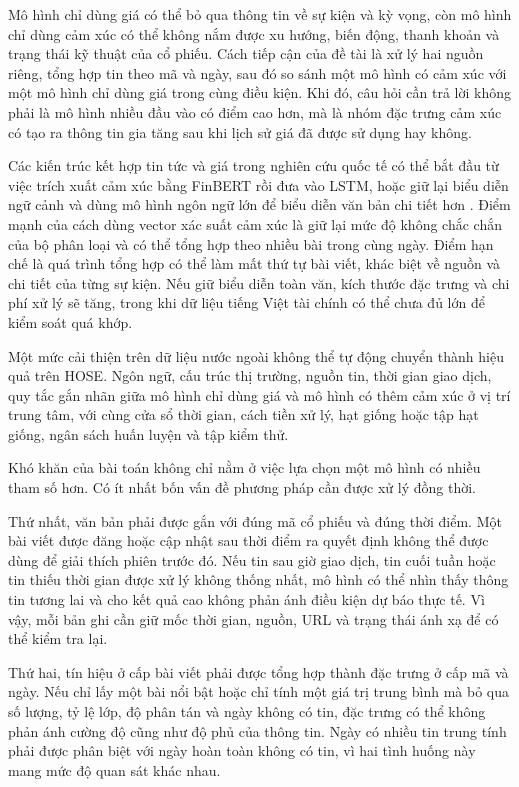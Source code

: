 Mô hình chỉ dùng giá có thể bỏ qua thông tin về sự kiện và kỳ vọng, còn mô hình chỉ dùng
cảm xúc có thể không nắm được xu hướng, biến động, thanh khoản và trạng thái kỹ thuật
của cổ phiếu. Cách tiếp cận của đề tài là xử lý hai nguồn riêng, tổng hợp tin theo mã
và ngày, sau đó so sánh một mô hình có cảm xúc với một mô hình chỉ dùng giá trong cùng
điều kiện. Khi đó, câu hỏi cần trả lời không phải là mô hình nhiều đầu vào có điểm cao
hơn, mà là nhóm đặc trưng cảm xúc có tạo ra thông tin gia tăng sau khi lịch sử giá đã
được sử dụng hay không.

Các kiến trúc kết hợp tin tức và giá trong nghiên cứu quốc tế có thể bắt đầu từ việc
trích xuất cảm xúc bằng FinBERT rồi đưa vào LSTM, hoặc giữ lại biểu diễn ngữ cảnh và
dùng mô hình ngôn ngữ lớn để biểu diễn văn bản chi tiết hơn
\cite{Halder2022_221107392v1,Gu2024_240716150v1,Elahi2024_241101368v1}. Điểm mạnh của
cách dùng vector xác suất cảm xúc là giữ lại mức độ không chắc chắn của bộ phân loại
và có thể tổng hợp theo nhiều bài trong cùng ngày. Điểm hạn chế là quá trình tổng hợp
có thể làm mất thứ tự bài viết, khác biệt về nguồn và chi tiết của từng sự kiện. Nếu
giữ biểu diễn toàn văn, kích thước đặc trưng và chi phí xử lý sẽ tăng, trong khi dữ
liệu tiếng Việt tài chính có thể chưa đủ lớn để kiểm soát quá khớp.

Một mức cải thiện trên dữ liệu nước ngoài không thể tự động chuyển thành hiệu quả trên
HOSE. Ngôn ngữ, cấu trúc thị trường, nguồn tin, thời gian giao dịch, quy tắc gắn nhãn
giữa mô hình chỉ dùng giá và mô hình có thêm cảm xúc ở vị trí trung tâm, với cùng cửa sổ
thời gian, cách tiền xử lý, hạt giống hoặc tập hạt giống, ngân sách huấn luyện và tập kiểm thử.

Khó khăn của bài toán không chỉ nằm ở việc lựa chọn một mô hình có nhiều tham số hơn.
Có ít nhất bốn vấn đề phương pháp cần được xử lý đồng thời.

Thứ nhất, văn bản phải được gắn với đúng mã cổ phiếu và đúng thời điểm. Một bài viết
được đăng hoặc cập nhật sau thời điểm ra quyết định không thể được dùng để giải thích
phiên trước đó. Nếu tin sau giờ giao dịch, tin cuối tuần hoặc tin thiếu thời gian được
xử lý không thống nhất, mô hình có thể nhìn thấy thông tin tương lai và cho kết quả cao
không phản ánh điều kiện dự báo thực tế. Vì vậy, mỗi bản ghi cần giữ mốc thời gian, nguồn,
URL và trạng thái ánh xạ để có thể kiểm tra lại.

Thứ hai, tín hiệu ở cấp bài viết phải được tổng hợp thành đặc trưng ở cấp mã và ngày.
Nếu chỉ lấy một bài nổi bật hoặc chỉ tính một giá trị trung bình mà bỏ qua số lượng,
tỷ lệ lớp, độ phân tán và ngày không có tin, đặc trưng có thể không phản ánh cường độ
cũng như độ phủ của thông tin. Ngày có nhiều tin trung tính phải được phân biệt với
ngày hoàn toàn không có tin, vì hai tình huống này mang mức độ quan sát khác nhau.

